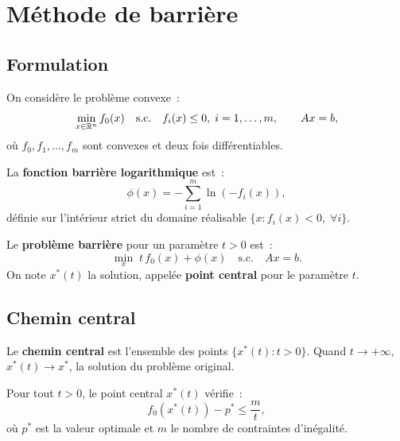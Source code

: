 \section{M\'ethode de barri\`ere}

\subsection{Formulation}

\begin{definition}
On consid\`ere le probl\`eme convexe~:
\[
  \min_{x \in \mathbb{R}^n} f_0(x) \quad \text{s.c.} \quad
  f_i(x) \leq 0, \; i = 1, \ldots, m, \qquad
  Ax = b,
\]
o\`u $f_0, f_1, \ldots, f_m$ sont convexes et deux fois diff\'erentiables.
\end{definition}

\begin{definition}
La \textbf{fonction barri\`ere logarithmique} est~:
\[
  \phi(x) = -\sum_{i=1}^m \ln(-f_i(x)),
\]
d\'efinie sur l'int\'erieur strict du domaine r\'ealisable
$\{x : f_i(x) < 0, \; \forall i\}$.
\end{definition}

\begin{definition}
Le \textbf{probl\`eme barri\`ere} pour un param\`etre $t > 0$ est~:
\[
  \min_{x} \; t \, f_0(x) + \phi(x) \quad \text{s.c.} \quad Ax = b.
\]
On note $x^*(t)$ la solution, appel\'ee \textbf{point central} pour le
param\`etre $t$.
\end{definition}

\subsection{Chemin central}

\begin{definition}
Le \textbf{chemin central} est l'ensemble des points
$\{x^*(t) : t > 0\}$. Quand $t \to +\infty$, $x^*(t) \to x^*$, la
solution du probl\`eme original.
\end{definition}

\begin{theoreme}
Pour tout $t > 0$, le point central $x^*(t)$ v\'erifie~:
\[
  f_0(x^*(t)) - p^* \leq \frac{m}{t},
\]
o\`u $p^*$ est la valeur optimale et $m$ le nombre de contraintes
d'in\'egalit\'e.
\end{theoreme}

